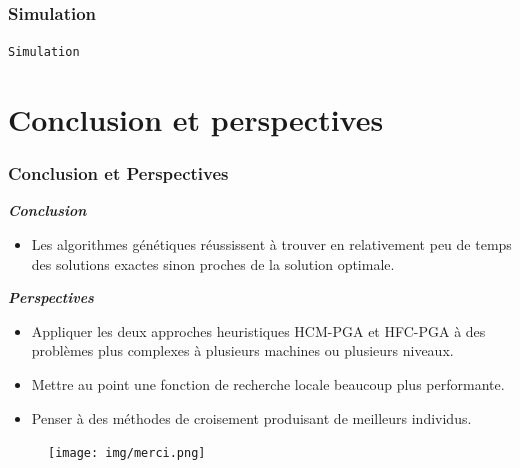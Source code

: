 \documentclass[11pt]{beamer}
\begin{document}
 \begin{frame}
  \frametitle{Simulation}
 	\begin{center}
 		\LARGE{\texttt{Simulation}}
 	\end{center}
 \end{frame} 
 
 \section{Conclusion et perspectives}
 \begin{frame}
  \frametitle{Conclusion et Perspectives}
  \textbf{\textsl{Conclusion}}
 	\begin{itemize}
 		\item Les algorithmes génétiques réussissent à trouver en relativement peu de temps des solutions exactes sinon proches de la solution optimale. 
 	\end{itemize}
 	
 	\textbf{\textsl{Perspectives}}
 	\begin{itemize}
 		\item Appliquer les deux approches heuristiques HCM-PGA et HFC-PGA à des problèmes plus complexes à plusieurs machines ou plusieurs niveaux.
 		\item Mettre au point une fonction de recherche locale beaucoup plus performante.
 		\item Penser à des méthodes de croisement produisant de meilleurs individus. 
 	\end{itemize}
 \end{frame}
 
 \begin{frame}
 	\begin{figure}[!h]
		\begin{center}
			\texttt{[image: img/merci.png]}
		\end{center}
 \end{figure}
 \end{frame}
 
% 
 
 
\end{document}
